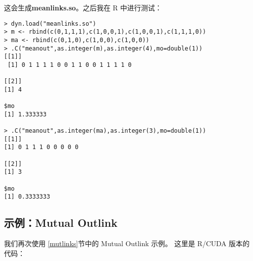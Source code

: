 这会生成{\bf meanlinks.so}。之后我在 R 中进行测试：

\begin{lstlisting}
> dyn.load("meanlinks.so")
> m <- rbind(c(0,1,1,1),c(1,0,0,1),c(1,0,0,1),c(1,1,1,0))
> ma <- rbind(c(0,1,0),c(1,0,0),c(1,0,0))
> .C("meanout",as.integer(m),as.integer(4),mo=double(1))
[[1]]
 [1] 0 1 1 1 1 0 0 1 1 0 0 1 1 1 1 0

[[2]]
[1] 4

$mo
[1] 1.333333

> .C("meanout",as.integer(ma),as.integer(3),mo=double(1))
[[1]]
[1] 0 1 1 1 0 0 0 0 0

[[2]]
[1] 3

$mo
[1] 0.3333333
\end{lstlisting}

\subsection{示例：Mutual Outlink}

我们再次使用
\ref{mutlinks}节中的 Mutual Outlink 示例。
这里是 R/CUDA 版本的代码：

